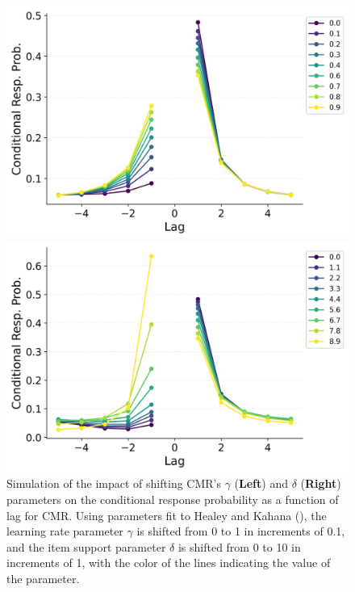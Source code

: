 \documentclass[
  man,
  floatsintext,
  longtable,
  nolmodern,
  notxfonts,
  notimes,
  draftfirst,
  colorlinks=true,linkcolor=blue,citecolor=blue,urlcolor=blue]{apa7}
\begin{document}
\begin{figure}

\caption{\label{fig-shiftlearning}Simulation of the impact of shifting
CMR's \(\gamma\) (\textbf{Left}) and \(\delta\) (\textbf{Right})
parameters on the conditional response probability as a function of lag
for CMR. Using parameters fit to Healey and Kahana
(), the learning rate parameter
\(\gamma\) is shifted from 0 to 1 in increments of 0.1, and the item
support parameter \(\delta\) is shifted from 0 to 10 in increments of 1,
with the color of the lines indicating the value of the parameter.}

\begin{minipage}{0.50\linewidth}
\includegraphics{shifting/BaseCMR_Learning_Rate_Parameter_Shifting_crp_HealeyKahana2014.png}\end{minipage}%
%
\begin{minipage}{0.50\linewidth}
\includegraphics{shifting/BaseCMR_Item_Support_Parameter_Shifting_crp_HealeyKahana2014.png}\end{minipage}%

\end{figure}%
\end{document}

